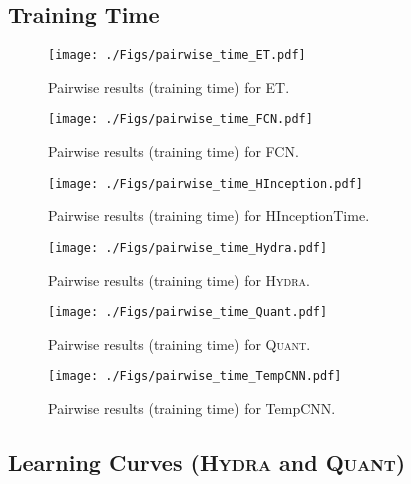 \documentclass[twoside,11pt,preprint]{article}
\newcommand{\quant}{\textsc{Quant}}
\newcommand{\hydra}{\textsc{Hydra}}
\begin{document}
\clearpage


\subsection{Training Time}

\begin{figure}[h]%
    \centering%
    \texttt{[image: ./Figs/pairwise\_time\_ET.pdf]}%
    \caption{Pairwise results (training time) for ET.}%
\end{figure}%

\begin{figure}[h]%
    \centering%
    \texttt{[image: ./Figs/pairwise\_time\_FCN.pdf]}%
    \caption{Pairwise results (training time) for FCN.}%
\end{figure}%

\begin{figure}[h]%
    \centering%
    \texttt{[image: ./Figs/pairwise\_time\_HInception.pdf]}%
    \caption{Pairwise results (training time) for HInceptionTime.}%
\end{figure}%

\begin{figure}[h]%
    \centering%
    \texttt{[image: ./Figs/pairwise\_time\_Hydra.pdf]}%
    \caption{Pairwise results (training time) for {\hydra}.}%
\end{figure}%

\begin{figure}[h]%
    \centering%
    \texttt{[image: ./Figs/pairwise\_time\_Quant.pdf]}%
    \caption{Pairwise results (training time) for {\quant}.}%
\end{figure}%

\begin{figure}[h]%
    \centering%
    \texttt{[image: ./Figs/pairwise\_time\_TempCNN.pdf]}%
    \caption{Pairwise results (training time) for TempCNN.}%
\end{figure}%

\clearpage

\subsection{Learning Curves ({\hydra} and {\quant})} \label{sec-appendix-curves-hydra-quant}
\end{document}
